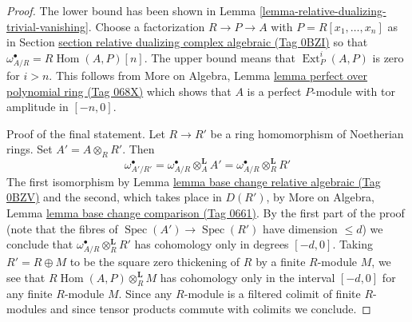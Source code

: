 \documentclass{amsart}
\theoremstyle{plain}
\theoremstyle{definition}
\theoremstyle{remark}
\numberwithin{equation}{subsection}
\def\Spec{\mathop{\mathrm{Spec}}}
\def\Hom{\mathop{\mathrm{Hom}}\nolimits}
\def\Ext{\mathop{\mathrm{Ext}}\nolimits}
\begin{document}
\begin{proof}
The lower bound has been shown in
Lemma \ref{lemma-relative-dualizing-trivial-vanishing}.
Choose a factorization $R \to P \to A$ with $P = R[x_1, \ldots, x_n]$
as in Section \href{https://stacks.math.columbia.edu/tag/0BZI}{section relative dualizing complex algebraic (Tag 0BZI)}
so that $\omega_{A/R}^\bullet = R\Hom(A, P)[n]$.
The upper bound means that $\Ext^i_P(A, P)$ is zero for $i > n$.
This follows from
More on Algebra, Lemma \href{https://stacks.math.columbia.edu/tag/068X}{lemma perfect over polynomial ring (Tag 068X)}
which shows that $A$ is a perfect $P$-module with
tor amplitude in $[-n, 0]$.

\medskip\noindent
Proof of the final statement. Let $R \to R'$ be a ring homomorphism
of Noetherian rings. Set $A' = A \otimes_R R'$. Then
$$
\omega_{A'/R'}^\bullet =
\omega_{A/R}^\bullet \otimes_A^\mathbf{L} A' =
\omega_{A/R}^\bullet \otimes_R^\mathbf{L} R'
$$
The first isomorphism by Lemma \href{https://stacks.math.columbia.edu/tag/0BZV}{lemma base change relative algebraic (Tag 0BZV)}
and the second, which takes place in $D(R')$, by
More on Algebra, Lemma \href{https://stacks.math.columbia.edu/tag/0661}{lemma base change comparison (Tag 0661)}.
By the first part of the proof
(note that the fibres of $\Spec(A') \to \Spec(R')$ have dimension $\leq d$)
we conclude that $\omega_{A/R}^\bullet \otimes_R^\mathbf{L} R'$
has cohomology only in degrees $[-d, 0]$. Taking $R' = R \oplus M$
to be the square zero thickening of $R$ by a finite $R$-module $M$,
we see that $R\Hom(A, P) \otimes_R^\mathbf{L} M$
has cohomology only in the interval $[-d, 0]$ for any finite $R$-module $M$.
Since any $R$-module is a filtered colimit of finite $R$-modules
and since tensor products commute with colimits we conclude.
\end{proof}
\end{document}

